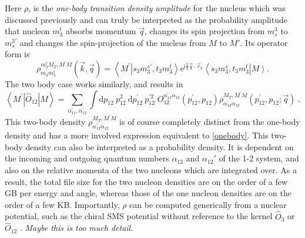 \documentclass[a4paper,11pt]{article}
\newcommand\bv[1]{\vec{#1}}
\newcommand{\ques}[1]{\color{red}\textit{ #1 }\color{black}}
\begin{document}
Here $\rho$, is the \textit{one-body transition density amplitude}
for the nucleus which was discussed previously and can truly be
interpreted as the probability amplitude that nucleon $m_3^t$ absorbs
momentum $\bv{q}$, changes its spin projection from $m_s^3$ to
$m_s^{3'}$ and changes the spin-projection of the nucleus from $M$ to
$M'$. Its operator form is
\begin{equation}
  \rho_{m_{3}^{\prime} m_{3}^{s}}^{m_{3}^{t} M_{T}, M^{\prime}
  M}(\bv{k}, \bv{q})=\left\langle M^{\prime}\right.\left|s_{3}
  m_{3}^{s \prime}, t_{3} m_{3}^{t}\right\rangle
  \mathrm{e}^{\mathrm{i} \frac{2}{3} \bv{q} \cdot
  \bv{r}_{3}}\left\langle s_{3} m_{3}^{s}, t_{3}
  m_{3}^{t}\right|\left. M\right\rangle\label{onebody}.
\end{equation}
The two body case works similarly, and results in
\begin{equation}
  \left\langle M^{\prime}\left|\hat{O}_{12}\right| M\right\rangle =
  \sum_{\alpha_{11}^{\prime}, \alpha_{12}} \int \mathrm{d} p_{12}\:
  p_{12}^{2} \mathrm{~d} p_{12}^{\prime}\: p_{12}^{\prime 2}\;
  O_{12}^{\alpha_{12}^{\prime} \alpha_{12}}\left(p_{12}^{\prime},
  p_{12}\right) \rho_{\alpha_{12}^{\prime} \alpha_{12}}^{M_{T},
  M^{\prime} M}\left(p_{12}^{\prime}, p_{12} ; \bv{q}\right)\label{twobody}\;.
\end{equation}
This two-body density $\rho_{\alpha_{12}^{\prime}
\alpha_{12}}^{M_{T}, M^{\prime} M}$ is of course completely distinct
from the one-body density and has a more involved expression
equivalent to \eqref{onebody}.
This two-body density can also be interpreted as a probability density.
It is dependent on the incoming and outgoing quantum numbers
$\alpha_{12}$ and $\alpha_{12}'$ of the 1-2 system, and also on the
relative momenta of the two nucleons which are integrated over.
As a result, the total file size for the two nucleon densities are on
the order of a few GB per energy and angle, whereas those of the one
nucleon densities are on the order of a few KB.
Importantly, $\rho$ can be computed generically from a nuclear
potential, such as the chiral SMS potential 
without reference to the kernel $\hat{O}_3$ or $\hat{O}_{12}$ \cite{Reinert2018}.
\ques{Maybe this is too much detail.}
\end{document}
